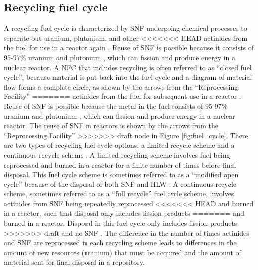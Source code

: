 \subsection{Recycling fuel cycle}
A recycling fuel cycle is characterized by \gls{SNF} undergoing chemical 
processes to separate out uranium, plutonium, and other 
<<<<<<< HEAD
actinides from the fuel for use in a reactor again \cite{rodriguez-penalonga_review_2017}. 
Reuse of \gls{SNF} is possible because it consists of 95-97\% uranium and 
plutonium \cite{rodriguez-penalonga_review_2017}, which can fission and 
produce energy in a nuclear reactor. A \gls{NFC} that includes 
recycling is often referred to as ``closed fuel cycle'', because material is 
put back into the fuel cycle and a diagram of material flow forms 
a complete circle, as shown by the arrows from the ``Reprocessing Facility''
=======
actinides from the fuel for subsequent use in a reactor
 \cite{rodriguez-penalonga_review_2017}. 
Reuse of \gls{SNF} is possible because the metal in the fuel 
consists of 95-97\% uranium and 
plutonium \cite{rodriguez-penalonga_review_2017}, which can fission and 
produce energy in a nuclear reactor. The reuse of \gls{SNF} in 
reactors is shown by the arrows from the ``Reprocessing Facility''
>>>>>>> draft
node in Figure \ref{fig:fuel_cycle}. 
There are two types of recycling fuel cycle options: a limited 
recycle scheme and a continuous recycle scheme \cite{wigeland_nuclear_2014}. 
A limited recycling scheme involves fuel being reprocessed and burned in 
a reactor for a finite number of times before final disposal. This
fuel cycle scheme is sometimes referred to as a ``modified open cycle''
because of the disposal of both \gls{SNF} and \gls{HLW}
\cite{wigeland_identification_2011}. A continuous 
recycle scheme, sometimes referred to as a ``full recycle'' fuel 
cycle scheme, involves actinides from \gls{SNF} being repeatedly reprocessed 
<<<<<<< HEAD
and burned in a reactor, such that disposal only includes fission products 
=======
and burned in a reactor. Disposal in this fuel cycle only includes 
fission products 
>>>>>>> draft
and no \gls{SNF} \cite{wigeland_identification_2011}. The difference 
in the number of times actinides and \gls{SNF} are reprocessed in each 
recycling scheme leads to differences in the amount of new resources 
(uranium) that must be acquired and the amount of material 
sent for final disposal in a repository. 

